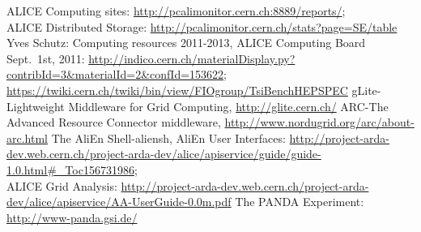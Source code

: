 \begin{thebibliography}{100}
 ALICE Computing sites:
\newline\url{http://pcalimonitor.cern.ch:8889/reports/};\\
ALICE Distributed Storage: \newline\url{http://pcalimonitor.cern.ch/stats?page=SE/table}
%
 Yves Schutz: Computing resources 2011-2013, ALICE Computing Board
Sept.~1st, 2011:
\newline\url{http://indico.cern.ch/materialDisplay.py?contribId=3&materialId=2&confId=153622};\\
\newline\url{https://twiki.cern.ch/twiki/bin/view/FIOgroup/TsiBenchHEPSPEC}
%
%
  gLite-Lightweight Middleware for Grid Computing,
\newline\url{http://glite.cern.ch/}
%
  ARC-The Advanced Resource Connector middleware,
\newline\url{http://www.nordugrid.org/arc/about-arc.html}
%
 The AliEn Shell-aliensh,
         AliEn User Interfaces:
\newline\url{http://project-arda-dev.web.cern.ch/project-arda-dev/alice/apiservice/guide/guide-1.0.html#_Toc156731986};\\
         ALICE Grid Analysis:
\newline\url{http://project-arda-dev.web.cern.ch/project-arda-dev/alice/apiservice/AA-UserGuide-0.0m.pdf}
%
  The PANDA Experiment: \url{http://www-panda.gsi.de/}


\end{thebibliography}
